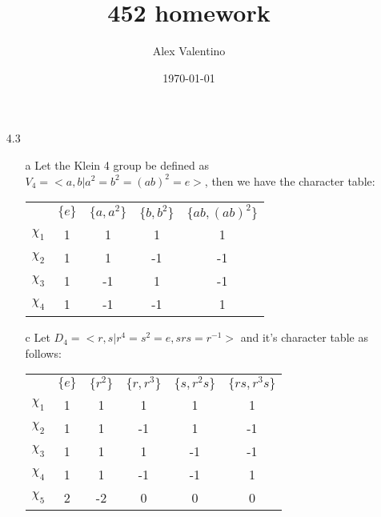 \documentclass[12pt, letterpaper]{article}
\date{\today}
\author{Alex Valentino}
\title{452 homework}
\begin{document}
\begin{enumerate}
	\item[4.3]
	\begin{enumerate}
		\item[a] Let the Klein 4 group be defined as $V_4 = <a,b | a^2 = b^2 = (ab)^2 = e>$, then we have the character 
		table:\\
		\begin{tabular}{c|cccc}
		& $\{e\}$& $\{a,a^2\}$ & $\{b,b^2\}$ & $\{ab,(ab)^2\}$\\
		$\chi_1$ & 1 & 1 & 1 & 1\\
		$\chi_2$ & 1 & 1 & -1 & -1\\
		$\chi_3$ & 1 & -1 & 1 & -1\\
		$\chi_4$ & 1 & -1 & -1 & 1\\		
		\end{tabular}
		\item[c] Let $D_4 = <r,s | r^4 = s^2 = e, srs = r^{-1}>$ and it's character table as follows:\\
		\begin{tabular}{c|ccccc}
		& $\{e\}$ & $\{r^2\}$ & $\{r,r^3\}$ & $\{s, r^2 s\}$ & $\{rs, r^3s\}$\\
		$\chi_1$ & 1 & 1 & 1 & 1 & 1\\
		$\chi_2$ & 1 &  1 & -1 & 1 & -1\\
		$\chi_3$ & 1 &  1 & 1 & -1 & -1\\
		$\chi_4$ & 1 &  1 & -1 & -1 & 1\\
		$\chi_5$ & 2 &  -2 & 0 & 0 & 0\\		
		\end{tabular}
		

\end{enumerate}
\end{enumerate}
\end{document}
